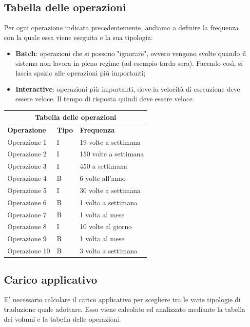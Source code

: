 \documentclass[legalpaper]{article}
\begin{document}
	\subsection{Tabella delle operazioni}
	Per ogni operazione indicata precedentemente, andiamo a definire la frequenza con la quale essa viene eseguita e la sua tipologia:
	\begin{itemize}
		\item \textbf{Batch}: operazioni che si possono "ignorare", ovvero vengono svolte quando il sistema non lavora in pieno regime (ad esempio tarda sera). Facendo così, si lascia spazio alle operazioni più importanti;
		\item \textbf{Interactive}: operazioni più importanti, dove la velocità di esecuzione deve essere veloce. Il tempo di risposta quindi deve essere veloce.
	\end{itemize}
		\renewcommand\arraystretch{2}
		\begin{tabular}{ |p{5cm}|p{2cm}|p{5cm}| }
			\hline
			\multicolumn{3}{|c|}{\textbf{Tabella delle operazioni}} \\
			\hline
			\textbf{Operazione} & \textbf{Tipo} & \textbf{Frequenza} \\
			\hline
			Operazione 1 & I &  19 volte a settimana \\ \hline
			Operazione 2 & I & 150 volte a settimana \\ \hline
			Operazione 3 & I & 450 a settimana \\ \hline
			Operazione 4 & B & 6 volte all'anno \\ \hline
			Operazione 5 & I & 30 volte a settimana \\ \hline
			Operazione 6 & B & 1 volta a settimana \\ \hline
			Operazione 7 & B & 1 volta al mese \\ \hline
			Operazione 8 & I & 10 volte al giorno \\ \hline
			Operazione 9 & B & 1 volta al mese \\ \hline
			Operazione 10 & B & 3 volta a settimana \\ \hline
		
		\end{tabular}	

\subsection{Carico applicativo}
E' necessario calcolare il carico applicativo per scegliere tra le varie tipologie di traduzione quale adottare. Esso viene calcolato ed analizzato mediante la tabella dei volumi e la tabella delle operazioni.
\end{document}
